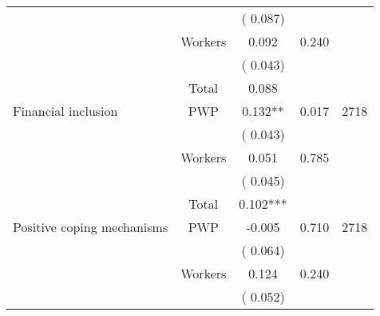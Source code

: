 \begin{tabular}{l*{4}{c}}
                               &                               &       (       0.087)                     & &                                                                             \\ 
                               &       Workers         &              0.092               &        0.240   &                                               \\ 
                               &                               &       (       0.043)                     & &                                                                             \\ 
\cmidrule{2-3}
                               &       Total           &              0.088                 &    &                                               \\ 
\cmidrule{2-3}
 Financial inclusion                 &       PWP     &              0.132**               &        0.017   & 2718                              \\ 
                               &                               &       (       0.043)                     & &                                                                             \\ 
                               &       Workers         &              0.051               &        0.785   &                                               \\ 
                               &                               &       (       0.045)                     & &                                                                             \\ 
\cmidrule{2-3}
                               &       Total           &              0.102***                 &    &                                               \\ 
\cmidrule{2-3}
 Positive coping mechanisms                &       PWP     &             -0.005               &       0.710    & 2718                              \\ 
                               &                               &       (       0.064)                     & &                                                                             \\ 
                               &       Workers         &              0.124               &        0.240   &                                               \\ 
                               &                               &       (       0.052)                     & &                                                                             \\ 

\end{tabular}
